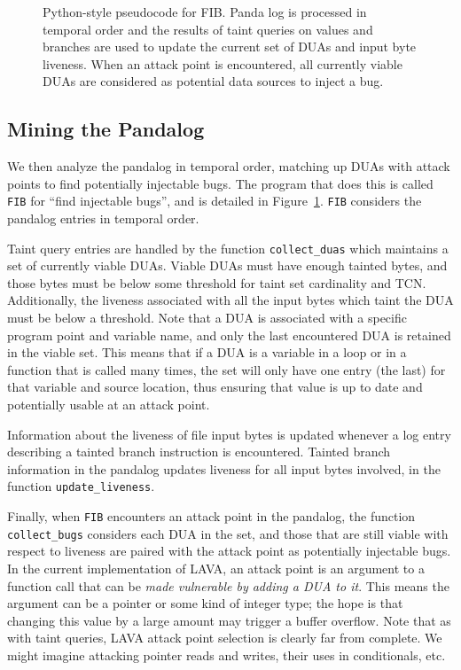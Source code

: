 \begin{figure}

\caption{Python-style pseudocode for FIB. 
Panda log is processed in temporal order and the results of taint queries on values and branches are 
used to update the current set of DUAs and input byte liveness.
When an attack point is encountered, all currently viable DUAs are considered as potential data sources to inject a bug.}
\label{alg:fib}
\end{figure}

\subsection{Mining the Pandalog}
\label{sec:mining}

We then analyze the pandalog in temporal order, matching up DUAs with attack points to find potentially injectable bugs.
The program that does this is called \verb+FIB+ for ``find injectable bugs'', and is detailed in Figure~\ref{alg:fib}.
\verb+FIB+ considers the pandalog entries in temporal order.

Taint query entries are handled by the function \verb+collect_duas+ which maintains a set of currently viable DUAs.
Viable DUAs must have enough tainted bytes, and those bytes must be below some threshold for taint set cardinality and TCN.
Additionally, the liveness associated with all the input bytes which taint the DUA must be below a threshold.
Note that a DUA is associated with a specific program point and variable name, and only the last encountered DUA is retained in the viable set. 
This means that if a DUA is a variable in a loop or in a function that is called many times, the set will only have one entry (the last) for that variable and source location, thus ensuring that value is up to date and potentially usable at an attack point.  

Information about the liveness of file input bytes is updated whenever a log entry describing a tainted branch instruction is encountered.
Tainted branch information in the pandalog updates liveness for all input bytes involved, in the function \verb+update_liveness+.

Finally, when \verb+FIB+ encounters an attack point in the pandalog, the function \verb+collect_bugs+ considers each DUA in the set,
and those that are still viable with respect to liveness are paired with the attack point as potentially injectable bugs.
In the current implementation of LAVA, an attack point is an argument to a function call that can be \emph{made vulnerable by adding a DUA to it}.
This means the argument can be a pointer or some kind of integer type; the hope is that changing this value by a large amount may trigger a buffer overflow.
Note that as with taint queries, LAVA attack point selection is clearly far from complete.
We might imagine attacking pointer reads and writes, their uses in conditionals, etc.  

